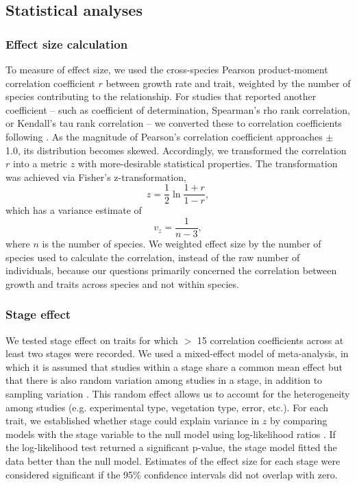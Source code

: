 \documentclass[a4paper,11pt]{article}
\begin{document}
\subsection*{Statistical analyses}\label{statistical-analyses}

\subsubsection*{Effect size calculation}\label{effect-size}

To measure of effect size, we used the cross-species Pearson product-moment correlation coefficient $r$ between growth rate and trait, weighted by the number of species contributing to the relationship. For studies that reported another coefficient -- such as coefficient of determination, Spearman's rho rank correlation, or Kendall's tau rank correlation -- we converted these to correlation coefficients following \citet{Lajeunesse:2013tm}. As the magnitude of Pearson's correlation coefficient approaches $\pm$ 1.0, its distribution becomes skewed. Accordingly, we transformed the correlation $r$ into a metric $z$ with more-desirable statistical properties. The transformation was achieved via Fisher's z-transformation,
\[ z = \frac{1}{2} \ln \frac{1+r}{1-r}, \]
which has a variance estimate of
\[ v_z= \frac{1}{n-3}, \]
where $n$ is the number of species. We weighted effect size by the number of species used to calculate the correlation, instead of the raw number of individuals, because our questions primarily concerned the correlation between growth and traits across species and not within species.

\subsubsection*{Stage effect}\label{stage-effect}

We tested stage effect on traits for which $>$ 15 correlation coefficients across at least two stages were recorded. We used a mixed-effect model of meta-analysis, in which it is assumed that studies within a stage share a common mean effect but that there is also random variation among studies in a stage, in addition to sampling variation \citep{Zuur:2009cfa}. This random effect allows us to account for the heterogeneity among studies (e.g. experimental type, vegetation type, error, etc.). For each trait, we established whether stage could explain variance in $z$ by comparing models with the stage variable to the null model using log-likelihood ratios \citep{Zuur:2009cfa}. If the log-likelihood test returned a significant p-value, the stage model fitted the data better than the null model. Estimates of the effect size for each stage were considered significant if the 95\% confidence intervals did not overlap with zero.
\end{document}
